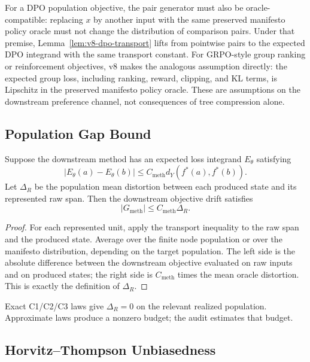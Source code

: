 For a DPO population objective, the pair generator must also be
oracle-compatible: replacing \(x\) by another input with the same preserved
manifesto policy oracle must not change the distribution of comparison pairs.
Under that premise, Lemma~\ref{lem:v8-dpo-transport} lifts from pointwise
pairs to the expected DPO integrand with the same transport constant. For
GRPO-style group ranking or reinforcement objectives, v8 makes the analogous
assumption directly: the expected group loss, including ranking, reward,
clipping, and KL terms, is Lipschitz in the preserved manifesto policy oracle.
These are assumptions on the downstream preference channel, not consequences
of tree compression alone.

\subsection{Population Gap Bound}

\begin{proposition}
\label{prop:v8-population-transport}
Suppose the downstream method has an expected loss integrand \(E_\theta\)
satisfying
\[
  |E_\theta(a)-E_\theta(b)|
  \le
  C_{\mathrm{meth}}d_Y(f^\ast(a),f^\ast(b)).
\]
Let \(\Delta_R\) be the population mean distortion between each produced state
and its represented raw span. Then the downstream objective drift satisfies
\[
  |G_{\mathrm{meth}}|
  \le
  C_{\mathrm{meth}}\Delta_R .
\]
\end{proposition}

\begin{proof}
For each represented unit, apply the transport inequality to the raw span and
the produced state. Average over the finite node population or over the
manifesto distribution, depending on the target population. The left side is
the absolute difference between the downstream objective evaluated on raw
inputs and on produced states; the right side is
\(C_{\mathrm{meth}}\) times the mean oracle distortion. This is exactly the
definition of \(\Delta_R\).
\end{proof}

Exact C1/C2/C3 laws give \(\Delta_R=0\) on the relevant realized population.
Approximate laws produce a nonzero budget; the audit estimates that budget.

\subsection{Horvitz--Thompson Unbiasedness}

